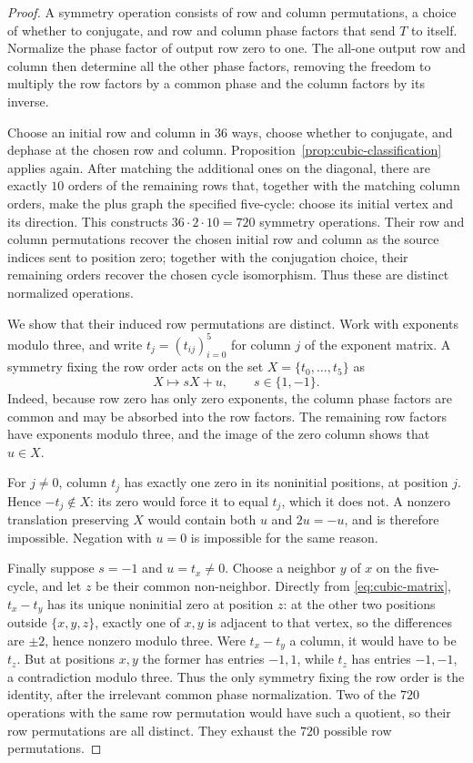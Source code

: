 \begin{proof}
A symmetry operation consists of row and column permutations, a choice
of whether to conjugate, and row and column phase factors that send $T$
to itself. Normalize the phase factor of output row zero to one.
The all-one output row and column then determine all the other phase
factors, removing the freedom to multiply the row factors by a common
phase and the column factors by its inverse.

Choose an initial row and column in $36$ ways, choose whether to
conjugate, and dephase at the chosen row and column.
Proposition~\ref{prop:cubic-classification} applies again. After matching
the additional ones on the diagonal, there are exactly $10$ orders of the remaining rows that,
together with the matching column orders, make the plus graph the
specified five-cycle: choose its initial vertex and its direction.
This constructs $36\cdot2\cdot10=720$ symmetry operations. Their row and
column permutations recover the chosen initial row and column as the
source indices sent to position zero; together with the conjugation
choice, their remaining orders recover the chosen cycle isomorphism.
Thus these are distinct normalized operations.

We show that their induced row permutations are distinct. Work with
exponents modulo three, and write $t_j=(t_{ij})_{i=0}^5$ for column $j$
of the exponent matrix. A symmetry fixing the row order acts on the
set $X=\{t_0,\ldots,t_5\}$ as
\[
 X\longmapsto sX+u,\qquad s\in\{1,-1\}.
\]
Indeed, because row zero has only zero exponents, the column phase
factors are common and may be absorbed into the row factors. The
remaining row factors have exponents modulo three, and the image of
the zero column shows that $u\in X$.

For $j\ne0$, column $t_j$ has exactly one zero in its noninitial
positions, at position $j$. Hence $-t_j\notin X$: its zero would force
it to equal $t_j$, which it does not. A nonzero translation preserving
$X$ would contain both $u$ and $2u=-u$, and is therefore impossible.
Negation with $u=0$ is impossible for the same reason.

Finally suppose $s=-1$ and $u=t_x\ne0$. Choose a neighbor $y$ of $x$
on the five-cycle, and let $z$ be their common non-neighbor. Directly
from \eqref{eq:cubic-matrix}, $t_x-t_y$ has its unique noninitial zero
at position $z$: at the other two positions outside $\{x,y,z\}$,
exactly one of $x,y$ is adjacent to that vertex, so the differences
are $\pm2$, hence nonzero modulo three. Were $t_x-t_y$ a column, it
would have to be $t_z$. But at
positions $x,y$ the former has entries $-1,1$, while $t_z$ has entries
$-1,-1$, a contradiction modulo three. Thus the only symmetry fixing
the row order is the identity, after the irrelevant common phase
normalization. Two of the $720$ operations with the same row
permutation would have such a quotient, so their row permutations
are all distinct. They exhaust the $720$ possible row permutations.


\end{proof}

